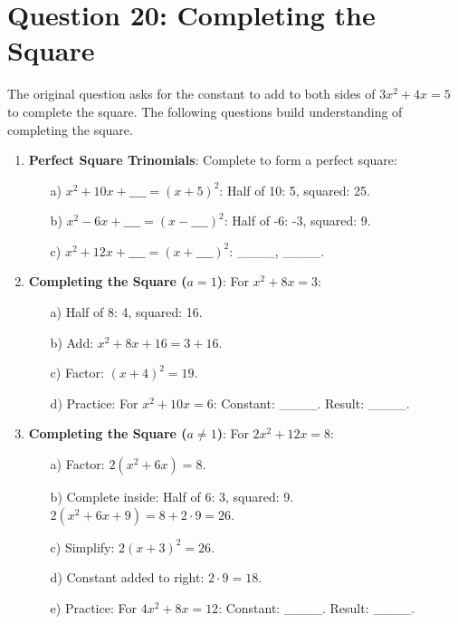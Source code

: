 \documentclass[12pt]{article}
\begin{document}
\section*{Question 20: Completing the Square}
The original question asks for the constant to add to both sides of \( 3x^2 + 4x = 5 \) to complete the square. The following questions build understanding of completing the square.

\begin{enumerate}[label=20.\arabic*]
    \item \textbf{Perfect Square Trinomials}: Complete to form a perfect square:
    \begin{enumerate}
        \item[a)] \( x^2 + 10x + \_\_\_\_ = (x + 5)^2 \): Half of 10: 5, squared: 25.
        \item[b)] \( x^2 - 6x + \_\_\_\_ = (x - \_\_\_\_)^2 \): Half of -6: -3, squared: 9.
        \item[c)] \( x^2 + 12x + \_\_\_\_ = (x + \_\_\_\_)^2 \): \_\_\_\_, \_\_\_\_.
    \end{enumerate}
    \item \textbf{Completing the Square (\( a = 1 \))}: For \( x^2 + 8x = 3 \):
    \begin{enumerate}
        \item[a)] Half of 8: 4, squared: 16.
        \item[b)] Add: \( x^2 + 8x + 16 = 3 + 16 \).
        \item[c)] Factor: \( (x + 4)^2 = 19 \).
        \item[d)] Practice: For \( x^2 + 10x = 6 \): Constant: \_\_\_\_. Result: \_\_\_\_.
    \end{enumerate}
    \item \textbf{Completing the Square (\( a \neq 1 \))}: For \( 2x^2 + 12x = 8 \):
    \begin{enumerate}
        \item[a)] Factor: \( 2(x^2 + 6x) = 8 \).
        \item[b)] Complete inside: Half of 6: 3, squared: 9. \\
        \( 2(x^2 + 6x + 9) = 8 + 2 \cdot 9 = 26 \).
        \item[c)] Simplify: \( 2(x + 3)^2 = 26 \).
        \item[d)] Constant added to right: \( 2 \cdot 9 = 18 \).
        \item[e)] Practice: For \( 4x^2 + 8x = 12 \): Constant: \_\_\_\_. Result: \_\_\_\_.
    \end{enumerate}

\end{enumerate}
\end{document}
